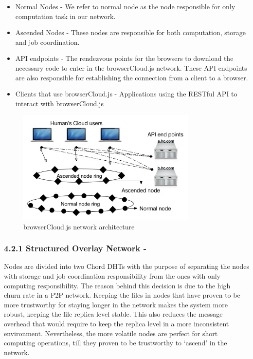 \begin{itemize}
  \item Normal Nodes - We refer to normal node as the node responsible for only computation task in our network.
  \item Ascended Nodes - These nodes are responsible for both computation, storage and job coordination.
  \item API endpoints - The rendezvous points for the browsers to download the necessary code to enter in the browserCloud.js network. These API endpoints are also responsible for establishing the connection from a client to a browser.
  \item Clients that use browserCloud.js - Applications using the RESTful API to interact with browserCloud.js
\end{itemize}

\begin{figure}[h!]
  \centering
  \includegraphics[width=0.8\textwidth]{img/overall.jpg}
  \caption{browserCloud.js network architecture}
  \label{fig:overallarchitecture}
\end{figure}


\subsubsection{4.2.1 Structured Overlay Network -}

Nodes are divided into two Chord DHTs with the purpose of separating the nodes with storage and job coordination responsibility from the ones with only computing responsibility. The reason behind this decision is due to the high churn rate in a P2P network. Keeping the files in nodes that have proven to be more trustworthy for staying longer in the network makes the system more robust, keeping the file replica level stable. This also reduces the message overhead that would require to keep the replica level in a more inconsistent environment. Nevertheless, the more volatile nodes are perfect for short computing operations, till they proven to be trustworthy to `ascend' in the network.



